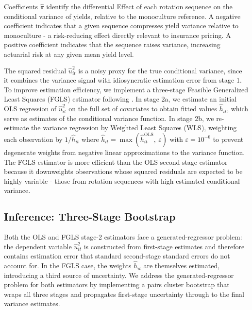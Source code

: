 \documentclass[12pt,letterpaper]{article}
\theoremstyle{remark}
\theoremstyle{remark}
\theoremstyle{plain}
\theoremstyle{definition}
\begin{document}
Coefficients $\hat{\pi}$ identify the differential Effect of each rotation sequence on the conditional variance of yields, relative to the monoculture reference. A negative coefficient indicates that a given sequence compresses yield variance relative to monoculture - a risk-reducing effect directly relevant to insurance pricing. A positive coefficient indicates that the sequence raises variance, increasing actuarial risk at any given mean yield level.

The squared residual $\hat{u}_{it}^2$ is a noisy proxy for the true conditional variance, since it combines the variance signal with idiosyncratic estimation error from stage 1. To improve estimation efficiency, we implement a three-stage Feasible Generalized Least Squares (FGLS) estimator following \cite{Harvey1976}. In stage 2a, we estimate an initial OLS regression of $\hat{u}_{it}^2$ on the full set of covariates to obtain fitted values $\hat{h}_{it}$, which serve as estimates of the conditional variance function. In stage 2b, we re-estimate the variance regression by Weighted Least Squares (WLS), weighting each observation by $1/\hat{h}_{it}$ where $\hat{h}_{it}= \max(\hat{h}_{it}^{\text{OLS}},\ \varepsilon)$ with $\varepsilon = 10^{-6}$ to prevent degenerate weights from negative linear approximations to the variance function. The FGLS estimator is more efficient than the OLS second-stage estimator because it downweights observations whose squared residuals are expected to be highly variable - those from rotation sequences with high estimated conditional variance.

\subsection{\label{subsec:bootstrap}Inference: Three-Stage Bootstrap}

Both the OLS and FGLS stage-2 estimators face a generated-regressor problem: the dependent variable $\hat{u}_{it}^2$ is constructed from first-stage estimates and therefore contains estimation error that standard second-stage standard errors do not account for. In the FGLS case, the weights $\hat{h}_{it}$ are themselves estimated, introducing a third source of uncertainty. We address the generated-regressor problem for both estimators by implementing a pairs cluster bootstrap that wraps all three stages and propagates first-stage uncertainty through to the final variance estimates.
\end{document}
